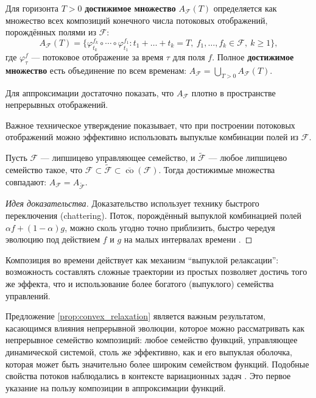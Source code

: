 \documentclass[../NDCNNAI_main.tex]{subfiles}
\begin{document}
\begin{definition}
\label{def:attainable_set}
Для горизонта $T > 0$ \textbf{достижимое множество} $A_{\mathcal{F}}(T)$ определяется как множество всех композиций конечного числа потоковых отображений, порождённых полями из $\mathcal{F}$:
\[
A_{\mathcal{F}}(T) = \{ \varphi_{t_k}^{f_k} \circ \cdots \circ \varphi_{t_1}^{f_1} : t_1 + \ldots + t_k = T, \ f_1, \ldots, f_k \in \mathcal{F}, \ k \geq 1 \},
\]
где $\varphi_{\tau}^{f}$ --- потоковое отображение за время $\tau$ для поля $f$. Полное \textbf{достижимое множество} есть объединение по всем временам: $A_{\mathcal{F}} = \bigcup_{T>0} A_{\mathcal{F}}(T)$.
\end{definition}
Для аппроксимации достаточно показать, что $A_{\mathcal{F}}$ плотно в пространстве непрерывных отображений.

Важное техническое утверждение показывает, что при построении потоковых отображений можно эффективно использовать выпуклые комбинации полей из $\mathcal{F}$.

\begin{proposition}
\label{prop:convex_relaxation}
Пусть $\mathcal{F}$ --- липшицево управляющее семейство, и $\widetilde{\mathcal{F}}$ --- любое липшицево семейство такое, что $\mathcal{F} \subset \widetilde{\mathcal{F}} \subset \overline{\operatorname{co}}(\mathcal{F})$. Тогда достижимые множества совпадают: $A_{\mathcal{F}} = A_{\widetilde{\mathcal{F}}}$.
\end{proposition}
\begin{proof}[Идея доказательства]
Доказательство использует технику быстрого переключения (chattering). Поток, порождённый выпуклой комбинацией полей $\alpha f + (1-\alpha)g$, можно сколь угодно точно приблизить, быстро чередуя эволюцию под действием $f$ и $g$ на малых интервалах времени \cite[Предложение 3.11]{Li2023DeepLD}.
\end{proof}

\begin{remark}
Композиция во времени действует как механизм ``выпуклой релаксации'': возможность составлять сложные траектории из простых позволяет достичь того же эффекта, что и использование более богатого (выпуклого) семейства управлений.
\end{remark}

Предложение \ref{prop:convex_relaxation} является важным результатом, касающимся влияния непрерывной эволюции, которое можно рассматривать как непрерывное семейство композиций: любое семейство функций, управляющее динамической системой, столь же эффективно, как и его выпуклая оболочка, которая может быть значительно более широким семейством функций. Подобные свойства потоков наблюдались в контексте вариационных задач \cite{Warga1962RelaxedVariational}. Это первое указание на пользу композиции в аппроксимации функций.
\end{document}
